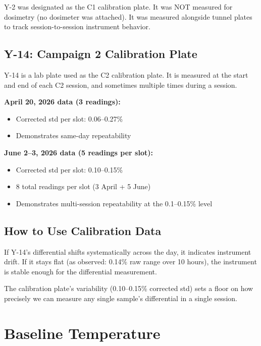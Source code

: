 \documentclass[11pt,letterpaper]{article}
\begin{document}
Y-2 was designated as the C1 calibration plate. It was NOT measured for
dosimetry (no dosimeter was attached). It was measured alongside tunnel plates to
track session-to-session instrument behavior.

\subsection{Y-14: Campaign 2 Calibration Plate}

Y-14 is a lab plate used as the C2 calibration plate. It is measured at the
start and end of each C2 session, and sometimes multiple times during a session.

\textbf{April 20, 2026 data (3 readings):}
\begin{itemize}[nosep]
  \item Corrected std per slot: 0.06--0.27\%
  \item Demonstrates same-day repeatability
\end{itemize}

\textbf{June 2--3, 2026 data (5 readings per slot):}
\begin{itemize}[nosep]
  \item Corrected std per slot: 0.10--0.15\%
  \item 8 total readings per slot (3 April + 5 June)
  \item Demonstrates multi-session repeatability at the 0.1--0.15\% level
\end{itemize}

\subsection{How to Use Calibration Data}

If Y-14's differential shifts systematically across the day, it indicates
instrument drift. If it stays flat (as observed: 0.14\% raw range over 10
hours), the instrument is stable enough for the differential measurement.

The calibration plate's variability (0.10--0.15\% corrected std) sets a floor on
how precisely we can measure any single sample's differential in a single
session.


\section{Baseline Temperature}
\label{sec:baseline-temp}
\end{document}
